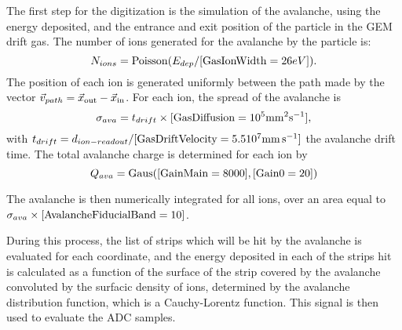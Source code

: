 The first step for the digitization is the simulation of the avalanche, using the energy deposited, and the entrance and exit position of the particle in the GEM drift gas.
The number of ions generated for the avalanche by the particle is:
%
\begin{equation}
  N_{ions} = {\rm Poisson}(E_{dep}/[{\rm GasIonWidth}=26 eV]). %
\end{equation}
%
The position of each ion is generated uniformly between the path made by the vector $\vec{v}_{path} = \vec{x}_{\rm out}-\vec{x}_{\rm in}$. 
For each ion, the spread of the avalanche is
%
\begin{equation}
  \sigma_{ava} = t_{drift} \times [{\rm GasDiffusion} = 10^5 {\rm mm}^2{\rm s}^{-1}],
\end{equation}
%
with $t_{drift} = d_{ion-readout}/[{\rm GasDriftVelocity} = 5.5 10^7 {\rm mm}\,{\rm s}^{-1}]$ the avalanche drift time.
The total avalanche charge is determined for each ion by
%
\begin{equation}
  Q_{ava} = {\rm Gaus}([{\rm GainMain} = 8000], [{\rm Gain0} = 20] )
\end{equation}
%

The avalanche is then numerically integrated for all ions, over an area equal to $\sigma_{ava} \times[{\rm AvalancheFiducialBand} = 10]$.
%
%

During this process, the list of strips which will be hit by the avalanche is evaluated for each coordinate, and the energy deposited in each of the strips hit is calculated as a function of the surface of the strip covered by the avalanche convoluted by the surfacic density of ions, determined by the avalanche distribution function, which is a Cauchy-Lorentz function.
This signal is then used to evaluate the ADC samples.

